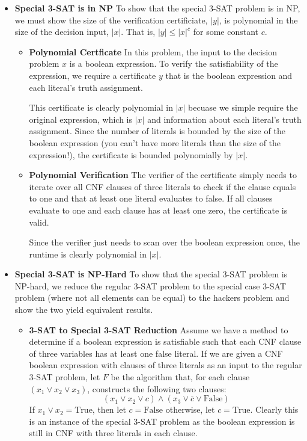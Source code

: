 \documentclass[12pt,twoside]{article}
\begin{document}
\begin{problems}
\begin{problemparts}
\begin{itemize}
  \item {\bf Special 3-SAT is in NP} To show that the special 3-SAT problem
  is in NP, we must show the size of the verification certificiate, $|y|$, is
  polynomial in the size of the decision input, $|x|$. That is, $|y| \leq
  |x|^c$ for some constant $c$.

  \begin{itemize} 

    \item {\bf Polynomial Certficate} In this problem, the input to the
    decision problem $x$ is a boolean expression. To verify the
    satisfiability of the expression, we require a certificate $y$ that is
    the boolean expression and each literal's truth assignment. 

    This certificate is clearly polynomial in $|x|$ becuase we simple require
    the original expression, which is $|x|$ and information about each
    literal's truth assignment. Since the number of literals is bounded by
    the size of the boolean expression (you can't have more literals than the
    size of the expression!), the certificate is bounded polynomially by
    $|x|$.

    \item {\bf Polynomial Verification} The verifier of the certificate
    simply needs to iterate over all CNF clauses of three literals to check
    if the clause equals to one and that at least one literal evaluates to
    false. If all clauses evaluate to one and each clause has at least one
    zero, the certificate is valid.

    Since the verifier just needs to scan over the boolean expression once,
    the runtime is clearly polynomial in $|x|$.

  \end{itemize}

  \item {\bf Special 3-SAT is NP-Hard} To show that the special 3-SAT problem
  is NP-hard, we reduce the regular 3-SAT problem to the special case 3-SAT
  problem (where not all elements can be equal) to the hackers problem and
  show the two yield equivalent results.

  \begin{itemize}

    \item {\bf 3-SAT to Special 3-SAT Reduction} Assume we have a method to
    determine if a boolean expression is satisfiable such that each CNF
    clause of three variables has at least one false literal. If we are given
    a CNF boolean expression with clauses of three literals as an input to
    the regular 3-SAT problem, let $F$ be the algorithm that, for each
    clause $(x_1 \lor x_2 \lor x_3)$, constructs the following two clauses:
    $$ (x_1 \lor x_2 \lor c) \land (x_3 \lor \overline{c} \lor
    \mathrm{False}) $$
    If $x_1 \lor x_2 = \mathrm{True}$, then let $c = \mathrm{False}$
    otherwise, let $c = \mathrm{True}$. Clearly this is an instance of the
    special 3-SAT problem as the boolean expression is still in CNF with
    three literals in each clause.


\end{itemize}
\end{itemize}
\end{problemparts}
\end{problems}
\end{document}
